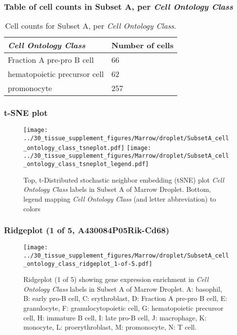 \subsubsection{Table of cell counts in Subset A, per \emph{Cell Ontology Class}}\begin{table}[h]
\centering
\label{my-label}
\begin{tabular}{@{}ll@{}}
\toprule

\emph{Cell Ontology Class}& Number of cells \\ \midrule
Fraction A pre-pro B cell & 66 \\

hematopoietic precursor cell & 62 \\

promonocyte & 257 \\
\bottomrule
\end{tabular}
\caption{Cell counts for Subset A, per \emph{Cell Ontology Class}.}
\end{table}

\clearpage
\subsubsection{t-SNE plot}
\begin{figure}[h]
\centering
\texttt{[image: ../30\_tissue\_supplement\_figures/Marrow/droplet/SubsetA\_cell\_ontology\_class\_tsneplot.pdf]}
\texttt{[image: ../30\_tissue\_supplement\_figures/Marrow/droplet/SubsetA\_cell\_ontology\_class\_tsneplot\_legend.pdf]}
\caption{Top, t-Distributed stochastic neighbor embedding (tSNE) plot  \emph{Cell Ontology Class} labels in Subset A of Marrow Droplet. Bottom, legend mapping \emph{Cell Ontology Class} (and letter abbreviation) to colors}
\end{figure}


\clearpage

\subsubsection{Ridgeplot (1 of 5, A430084P05Rik-Cd68)}
\begin{figure}[h]
\centering
\texttt{[image: ../30\_tissue\_supplement\_figures/Marrow/droplet/SubsetA\_cell\_ontology\_class\_ridgeplot\_1-of-5.pdf]}

\caption{ Ridgeplot (1 of 5)  showing gene expression enrichment in \emph{Cell Ontology Class} labels in Subset A of Marrow Droplet. A: basophil, B: early pro-B cell, C: erythroblast, D: Fraction A pre-pro B cell, E: granulocyte, F: granulocytopoietic cell, G: hematopoietic precursor cell, H: immature B cell, I: late pro-B cell, J: macrophage, K: monocyte, L: proerythroblast, M: promonocyte, N: T cell.}
\end{figure}


